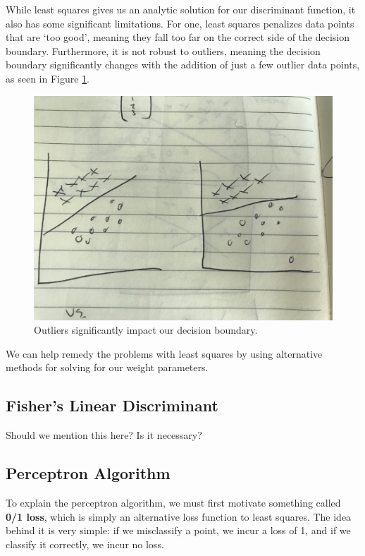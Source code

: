While least squares gives us an analytic solution for our discriminant function, it also has some significant limitations. For one, least squares penalizes data points that are `too good', meaning they fall too far on the correct side of the decision boundary. Furthermore, it is not robust to outliers, meaning the decision boundary significantly changes with the addition of just a few outlier data points, as seen in Figure \ref{fig:outlier-phenomenon}.

\begin{figure}
    \centering
    \includegraphics[width=0.5\paperwidth]{../Classification/fig/outlier_phenomenon.jpg}
    \caption{Outliers significantly impact our decision boundary.}
    \label{fig:outlier-phenomenon}
\end{figure}

We can help remedy the problems with least squares by using alternative methods for solving for our weight parameters.

\subsection{Fisher's Linear Discriminant}
Should we mention this here? Is it necessary?

\subsection{Perceptron Algorithm}
To explain the perceptron algorithm, we must first motivate something called \textbf{0/1 loss}, which is simply an alternative loss function to least squares. The idea behind it is very simple: if we misclassify a point, we incur a loss of 1, and if we classify it correctly, we incur no loss.


